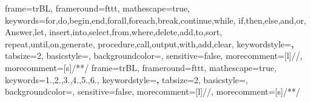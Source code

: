 	{frame=trBL,
	frameround=fttt,
	mathescape=true,
	keywords={for,do,begin,end,forall,foreach,break,continue,while,
            if,then,else,and,or,
            Answer,let,
            insert,into,select,from,where,delete,add,to,sort,
            repeat,until,on,generate,
            procedure,call,output,with,add,clear},
	keywordstyle=\textbf,
	tabsize=2,
	basicstyle=\small,
	backgroundcolor=\color{green!2!white},
	sensitive=false,
	morecomment=[l]{//},
	morecomment=[s]{/*}{*/}%
	}
	{frame=trBL,
	frameround=fttt,
	mathescape=true,
  keywords={1.,2.,3.,4.,5.,6.},
	keywordstyle=\textbf,
	tabsize=2,
	basicstyle=\small,
	backgroundcolor=\color{green!2!white},
	sensitive=false,
	morecomment=[l]{//},
	morecomment=[s]{/*}{*/}%
	}
\lstset{language=pseudocodigo}




\usepackage{dtklogos} %



\usepackage{longtable}

\usepackage{amsthm}
\usepackage{thmtools}

\newtheorem{defn}{Definición}
\newtheorem{Lemma}{Lema}
\newtheorem{prop}{Propiedad}

\usepackage{afterpage}

\def\BibTeX{\textsc{Bib}\TeX}

